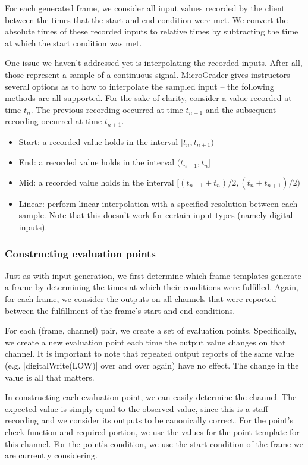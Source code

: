 \documentclass[12pt]{article}
\begin{document}
For each generated frame, we consider all input values recorded by the client between the times that the start and end condition were met.  We convert the absolute times of these recorded inputs to relative times by subtracting the time at which the start condition was met.

One issue we haven't addressed yet is interpolating the recorded inputs.  After all, those represent a sample of a continuous signal.  MicroGrader gives instructors several options as to how to interpolate the sampled input -- the following methods are all supported.  For the sake of clarity, consider a value recorded at time $t_n$.  The previous recording occurred at time $t_{n-1}$ and the subsequent recording occurred at time $t_{n+1}$.

\begin{itemize}
\item Start: a recorded value holds in the interval $[t_n, t_{n+1})$
\item End: a recorded value holds in the interval $(t_{n-1}, t_n]$
\item Mid: a recorded value holds in the interval $[(t_{n-1} + t_n)/2, (t_n + t_{n+1})/2)$
\item Linear: perform linear interpolation with a specified resolution between each sample.  Note that this doesn't work for certain input types (namely digital inputs).
\end{itemize}

\subsubsection{Constructing evaluation points}
\label{sec:using-point-templates}
Just as with input generation, we first determine which frame templates generate a frame by determining the times at which their conditions were fulfilled.  Again, for each frame, we consider the outputs on all channels that were reported between the fulfillment of the frame's start and end conditions.

For each (frame, channel) pair, we create a set of evaluation points.  Specifically, we create a new evaluation point each time the output value changes on that channel.  It is important to note that repeated output reports of the same value (e.g. |digitalWrite(LOW)| over and over again) have no effect.  The change in the value is all that matters.

In constructing each evaluation point, we can easily determine the channel.  The expected value is simply equal to the observed value, since this is a staff recording and we consider its outputs to be canonically correct.   For the point's check function and required portion, we use the values for the point template for this channel.  For the point's condition, we use the start condition of the frame we are currently considering.
\end{document}
